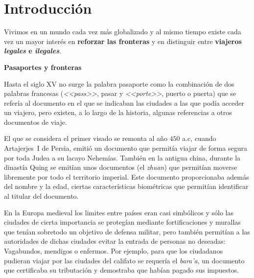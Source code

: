 \chapter{Introducción\label{ch:intro}}


Vivimos en un mundo cada vez más globalizado y al mismo tiempo existe cada vez un mayor interés en \textbf{reforzar las fronteras} y en distinguir entre \textbf{viajeros \textit{legales} e \textit{ilegales}}.

\medskip
\textbf{Pasaportes y fronteras} 
\medskip

Hasta el siglo XV no surge la palabra pasaporte como la combinación de dos palabras francesas (\textit{<<pass>>}, pasar  y \textit{<<porte>>}, puerto o puerta) que se refería al documento en el que se indicaban las ciudades a las que podía acceder un viajero, pero existen, a lo largo de la historia, algunas referencias a otros documentos de viaje. 

El que se considera el primer visado se remonta al año $450$ a.c, cuando \mbox{Artajerjes I} de Persia, emitió un documento que  permitía viajar de forma segura por toda Judea a su lacayo Nehemías. También en la antigua china, durante la dinastía Quing se emitían unos documentos (el \textit{zhuan}) que permitían moverse libremente por todo el territorio imperial. Este documento proporcionaba además del nombre y la edad, ciertas características biométricas que permitían identificar al titular del documento. 

En la Europa medieval los limites entre países eran casi simbólicos y sólo las ciudades de cierta importancia se protegían mediante fortificaciones y murallas que tenían sobretodo un objetivo de defensa militar, pero también permitían a las autoridades de dichas ciudades evitar la entrada de personas no deseadas: Vagabundos, mendigos o enfermos. Por ejemplo, para que los ciudadanos pudieran viajar por las ciudades del califato se requería el \textit{bara'a}, un documento que certificaba su tributación y demostraba que habían pagado sus impuestos.


